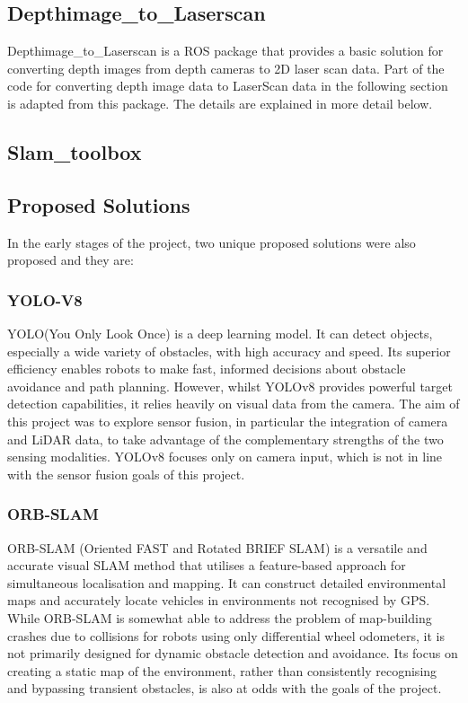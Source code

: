 \subsection{Depthimage\_to\_Laserscan}
Depthimage\_to\_Laserscan is a ROS package that provides a basic solution for converting depth images from depth cameras to 2D laser scan data. Part of the code for converting depth image data to LaserScan data in the following section is adapted from this package. The details are explained in more detail below.
\subsection{Slam\_toolbox}
\subsection{Proposed Solutions}
In the early stages of the project, two unique proposed solutions were also proposed and they are:
\subsubsection{YOLO-V8}
YOLO(You Only Look Once) is a deep learning model. It can detect objects, especially a wide variety of obstacles, with high accuracy and speed. Its superior efficiency enables robots to make fast, informed decisions about obstacle avoidance and path planning.
However, whilst YOLOv8 provides powerful target detection capabilities, it relies heavily on visual data from the camera. The aim of this project was to explore sensor fusion, in particular the integration of camera and LiDAR data, to take advantage of the complementary strengths of the two sensing modalities. YOLOv8 focuses only on camera input, which is not in line with the sensor fusion goals of this project.
\subsubsection{ORB-SLAM}
ORB-SLAM (Oriented FAST and Rotated BRIEF SLAM) is a versatile and accurate visual SLAM method that utilises a feature-based approach for simultaneous localisation and mapping. It can construct detailed environmental maps and accurately locate vehicles in environments not recognised by GPS.
While ORB-SLAM is somewhat able to address the problem of map-building crashes due to collisions for robots using only differential wheel odometers, it is not primarily designed for dynamic obstacle detection and avoidance. Its focus on creating a static map of the environment, rather than consistently recognising and bypassing transient obstacles, is also at odds with the goals of the project.
